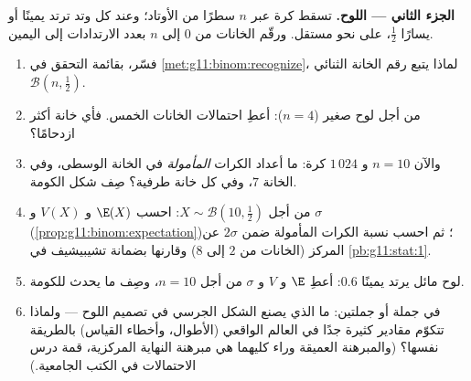 \begin{problem}
\medskip
\noindent\textbf{الجزء الثاني --- اللوح.}
تسقط كرة عبر $n$ سطرًا من الأوتاد؛ وعند كل وتد ترتد
يمينًا أو يسارًا  $\frac12$، على نحو مستقل. ورقّم
الخانات من $0$ إلى $n$ بعدد الارتدادات إلى اليمين.
\begin{enumerate}[resume]
  \item فسّر، بقائمة التحقق في
        \cref{met:g11:binom:recognize}، لماذا يتبع رقم الخانة
         الثنائي
        $\mathcal B\!\left(n, \frac12\right)$.
  \item من أجل لوح صغير ($n = 4$): أعطِ احتمالات الخانات
        الخمس. فأي خانة أكثر ازدحامًا؟
  \item والآن $n = 10$ و $1\,024$ كرة: ما أعداد الكرات
        \emph{المأمولة} في الخانة الوسطى، وفي الخانة
        $7$، وفي كل خانة طرفية؟ صِف شكل الكومة.
  \item من أجل $X \sim \mathcal B\!\left(10, \frac12\right)$:
        احسب $\E(X)$ و $V(X)$ و $\sigma$
        (\cref{prop:g11:binom:expectation})؛ ثم احسب
        نسبة الكرات المأمولة ضمن $2\sigma$ عن
        المركز (الخانات من $2$ إلى $8$) وقارنها بضمانة
        تشيبيشيف في \cref{pb:g11:stat:1}.
  \item لوح مائل يرتد يمينًا  $0.6$:
        أعطِ $\E$ و $V$ و $\sigma$ من أجل $n = 10$، وصِف
        ما يحدث للكومة.
  \item في جملة أو جملتين: ما الذي يصنع الشكل الجرسي
        في تصميم اللوح --- ولماذا تتكوّم مقادير كثيرة جدًا
        في العالم الواقعي (الأطوال، وأخطاء القياس)
        بالطريقة نفسها؟ (والمبرهنة العميقة وراء كليهما هي
        مبرهنة النهاية المركزية، قمة درس الاحتمالات في
        الكتب الجامعية.)
\end{enumerate}


\end{problem}
